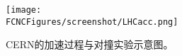 \begin{figure}[H]
\centering
\texttt{[image: \\FCNCFigures/screenshot/LHCacc.png]}
\caption{CERN的加速过程与对撞实验示意图。}
\label{fig:LHCacc}
\end{figure}